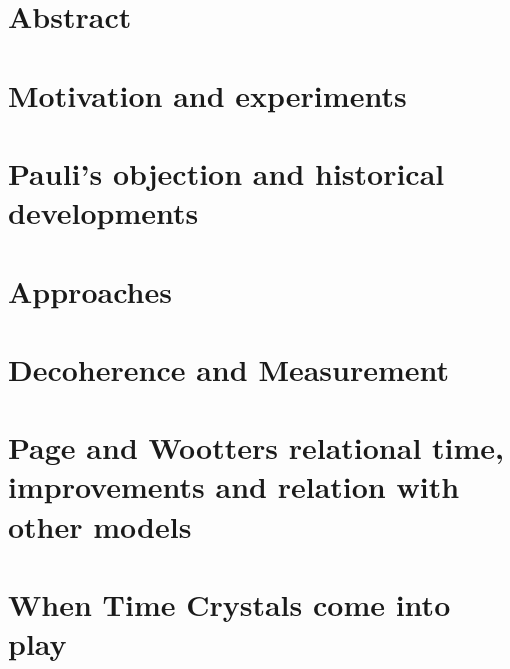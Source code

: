 




\maketitle

\tableofcontents

\chapter*{Abstract}


\iftodo
\chapter{Motivation and experiments}

\fi

\chapter{Pauli's objection and historical developments}


\iftodo
\chapter{Approaches}

\fi

\chapter{Decoherence and Measurement}








\chapter{Page and Wootters relational time, improvements and relation with other models}






\iftodo
\chapter{When Time Crystals come into play}

\fi

